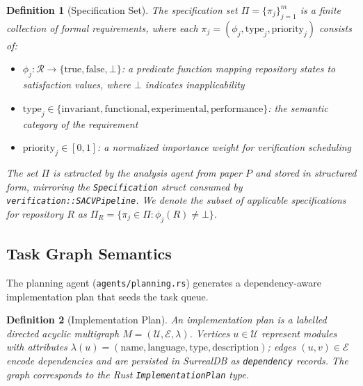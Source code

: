 \documentclass{ieeeaccess}
\newtheorem{definition}{Definition}
\begin{document}
\begin{definition}[Specification Set]
The specification set \(\Pi = \{\pi_j\}_{j=1}^{m}\) is a finite collection of formal requirements, where each \(\pi_j = (\phi_j, \text{type}_j, \text{priority}_j)\) consists of:
\begin{itemize}
\item \(\phi_j: \mathcal{R} \to \{\text{true}, \text{false}, \bot\}\): a predicate function mapping repository states to satisfaction values, where \(\bot\) indicates inapplicability
\item \(\text{type}_j \in \{\text{invariant}, \text{functional}, \text{experimental}, \text{performance}\}\): the semantic category of the requirement
\item \(\text{priority}_j \in [0,1]\): a normalized importance weight for verification scheduling
\end{itemize}
The set \(\Pi\) is extracted by the analysis agent from paper \(P\) and stored in structured form, mirroring the \texttt{Specification} struct consumed by \texttt{verification::SACVPipeline}. We denote the subset of applicable specifications for repository \(R\) as \(\Pi_R = \{\pi_j \in \Pi : \phi_j(R) \neq \bot\}\).
\end{definition}

\subsection{Task Graph Semantics}
The planning agent (\texttt{agents/planning.rs}) generates a dependency-aware implementation plan that seeds the task queue.

\begin{definition}[Implementation Plan]
An implementation plan is a labelled directed acyclic multigraph \(M = (\mathcal{U}, \mathcal{E}, \lambda)\). Vertices \(u \in \mathcal{U}\) represent modules with attributes \(\lambda(u) = (\text{name}, \text{language}, \text{type}, \text{description})\); edges \((u,v) \in \mathcal{E}\) encode dependencies and are persisted in SurrealDB as \texttt{dependency} records. The graph corresponds to the Rust \texttt{ImplementationPlan} type.
\end{definition}
\end{document}
